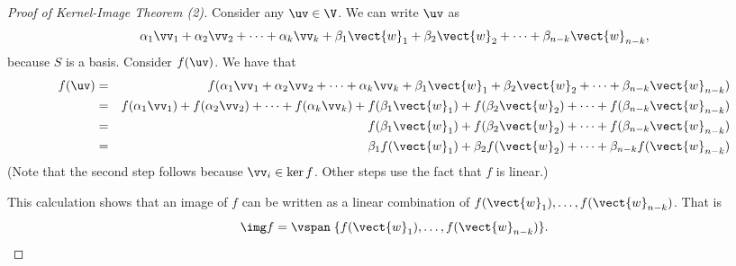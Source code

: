 \begin{frame}
  \begin{proof}[Proof of Kernel-Image Theorem (2)]

  Consider any $\uv\in\V$.  We can write $\uv$ as
  \[
  \alpha_1\vv_1 + \alpha_2\vv_2 + \cdots + \alpha_k\vv_k +
  \beta_1\vect{w}_1 + \beta_2\vect{w}_2 + \cdots +
  \beta_{n-k}\vect{w}_{n-k},
  \]
  because $S$ is a basis.  Consider $f(\uv)$.  We have that
  \begin{eqnarray*}
  f(\uv) & = & 
  f(\alpha_1\vv_1 + \alpha_2\vv_2 + \cdots + \alpha_k\vv_k +
  \beta_1\vect{w}_1 + \beta_2\vect{w}_2 + \cdots +
  \beta_{n-k}\vect{w}_{n-k}) \\
  & = & 
  f(\alpha_1\vv_1) + f(\alpha_2\vv_2) + \cdots + f(\alpha_k\vv_k) +
  f(\beta_1\vect{w}_1) + f(\beta_2\vect{w}_2) + \cdots +
  f(\beta_{n-k}\vect{w}_{n-k}) \\
  & = & 
  f(\beta_1\vect{w}_1) + f(\beta_2\vect{w}_2) + \cdots +
  f(\beta_{n-k}\vect{w}_{n-k}) \\
  & = & 
  \beta_1f(\vect{w}_1) + \beta_2f(\vect{w}_2) + \cdots +
  \beta_{n-k}f(\vect{w}_{n-k})
  \end{eqnarray*}
  {\tiny (Note that the second step follows because $\vv_i\in\ker f$.  Other
  steps use the fact that $f$ is linear.)}

  This calculation shows that an image of $f$ can be written as a
  linear combination of $f(\vect{w}_1),\ldots,f(\vect{w}_{n-k})$.
  That is
  \[
  \img f = \vspan\; \{f(\vect{w}_1),\ldots,f(\vect{w}_{n-k})\}.
  \]
  \end{proof}
\end{frame}

